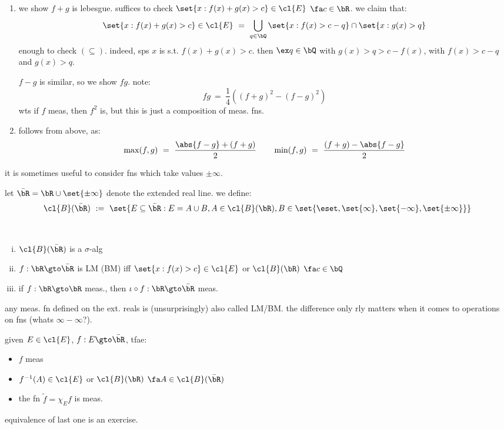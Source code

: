 \begin{pf} \vspace{-0.2in}
	\begin{enumerate}
		\item[iii)] we show $f+g$ is lebesgue.
			suffices to check $\set{x:f(x)+g(x)>c}\in\cl{E}$ $\fa c\in\bR$.
			we claim that:
			\begin{equation*}
				\set{x:f(x)+g(x)>c}\in\cl{E}
				\ = \ \bigcup_{q\in\bQ}\set{x:f(x)>c-q}\cap\set{x:g(x)>q}
			\end{equation*}
			enough to check $(\subseteq)$.
			indeed, sps $x$ is s.t. $f(x)+g(x)>c$.
			then $\ex q\in\bQ$ with $g(x)>q>c-f(x)$, with
			$f(x)>c-q$ and $g(x)>q$.

			$f-g$ is similar, so we show $fg$. note:
			\begin{equation*}
				fg \ = \ \frac{1}{4}\left((f+g)^{2}-(f-g)^{2}\right)
			\end{equation*}
			wts if $f$ meas, then $f^{2}$ is,
			but this is just a composition of meas. fns.
		\item [iv)] follows from above, as:
			\begin{equation*}
				\max(f,g) \ = \ \frac{\abs{f-g}+(f+g)}{2} \qquad
				\min(f,g) \ = \ \frac{(f+g)-\abs{f-g}}{2}
			\end{equation*}
	\end{enumerate}
\end{pf}

it is sometimes useful to consider fns which take values $\pm \infty$.
\begin{defn}
	let $\bar{\bR}=\bR\cup\set{\pm \infty}$ denote the extended real line.
	we define:
	\begin{equation*}
		\cl{B}(\bar{\bR}) \ := \
		\set{E\subseteq\bar{\bR}:E=A\cup B,A\in\cl{B}(\bR),B\in\set{\eset,\set{\infty},\set{-\infty},\set{\pm \infty}}}
	\end{equation*}
\end{defn} \

\begin{exr} \vspace{-0.2in}
	\begin{enumerate}[i)]
		\item $\cl{B}(\bar{\bR})$ is a $\sigma$-alg
		\item $f:\bR\gto\bar{\bR}$ is LM (BM) iff
			$\set{x:f(x)>c}\in\cl{E}$ or $\cl{B}(\bR)$ $\fa c\in\bQ$
		\item if $f:\bR\gto\bR$ meas., then $\iota\circ f:\bR\gto\bar{\bR}$ meas.
	\end{enumerate}
\end{exr}
any meas. fn defined on the ext. reals is (unsurprisingly) also called LM/BM.
the difference only rly matters when it comes to operations on fns (whats $\infty-\infty$?).

given $E\in\cl{E}$, $f:E\gto\bar{\bR}$, tfae:
\begin{itemize}
	\item $f$ meas
	\item $f^{-1}(A)\in\cl{E}$ or $\cl{B}(\bR)$ $\fa A\in\cl{B}(\bar{\bR})$
	\item the fn $\tilde{f} = \chi_{E}f$ is meas.
\end{itemize}
equivalence of last one is an exercise.
